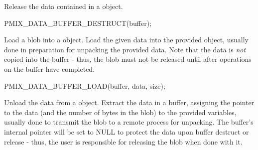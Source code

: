 \begin{arglist}
\end{arglist}


Release the data contained in a  object.

\cspecificstart
\begin{codepar}
PMIX_DATA_BUFFER_DESTRUCT(buffer);
\end{codepar}
\cspecificend

\begin{arglist}
\end{arglist}



Load a blob into a  object.
Load the given data into the provided  object, usually done in preparation for unpacking the provided data. Note that the data is \textit{not} copied into the buffer - thus, the blob must not be released until after operations on the buffer have completed.

\cspecificstart
\begin{codepar}
PMIX_DATA_BUFFER_LOAD(buffer, data, size);
\end{codepar}
\cspecificend

\begin{arglist}
\end{arglist}


Unload the data from a  object.
Extract the data in a buffer, assigning the pointer to the data (and the number of bytes in the blob) to the provided variables, usually done to transmit the blob to a remote process for unpacking. The buffer's internal pointer will be set to NULL to protect the data upon buffer destruct or release - thus, the user is responsible for releasing the blob when done with it.

